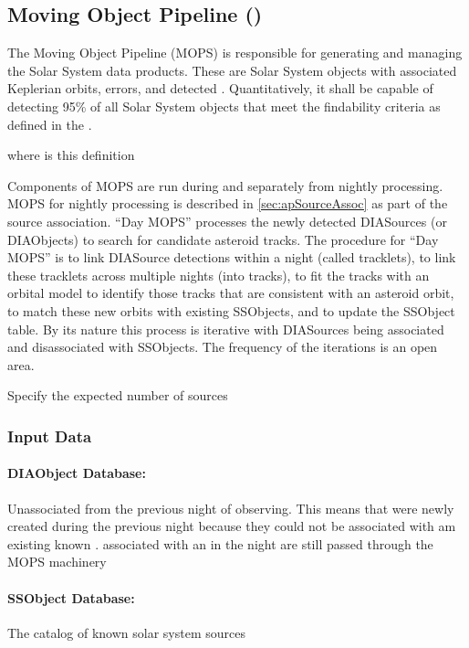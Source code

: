 \subsection{Moving Object Pipeline (\wbsMOPS)}

The Moving Object Pipeline (MOPS) is responsible for generating and managing the Solar System data products. These are Solar System objects with associated Keplerian orbits, errors, and detected \DIASources. Quantitatively, it shall be capable of detecting 95\% of all Solar System objects that meet the findability criteria as defined in the \OSS\@. 
\begin{note} where is this definition \end{note}

Components of MOPS are run during and separately from nightly processing. MOPS for nightly processing is described in \ref{sec:apSourceAssoc} as part of the source association. ``Day MOPS'' processes the newly detected DIASources (or DIAObjects) to search for candidate asteroid tracks. The procedure for ``Day MOPS'' is to link DIASource detections within a night (called tracklets), to link these tracklets across multiple nights (into tracks), to fit the tracks with an orbital model to identify those tracks that are consistent with an asteroid orbit, to match these new orbits with existing SSObjects, and to update the SSObject table. By its nature this process is iterative with DIASources being associated and disassociated with SSObjects. The frequency of the iterations is an open area.

\begin{note} Specify the expected number of sources \end{note}

\subsubsection{Input Data}

\paragraph*{DIAObject Database: } Unassociated \DIASources from the previous night of observing.  This means \DIAObjects that were newly created during the previous night because they could not be associated with am existing known \DIAObject.  \DIASources associated with an \SSObject in the night are still passed through the MOPS machinery

\paragraph*{SSObject Database: } The catalog of known solar system sources

